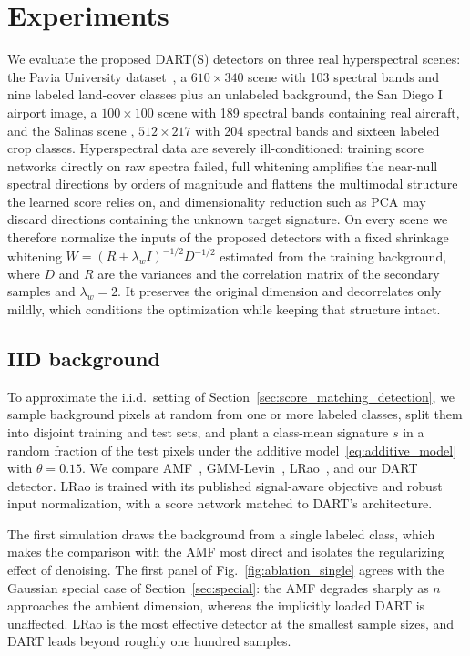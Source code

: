 \chapter{Experiments}
\label{sec:experiments}
We evaluate the proposed DART(S) detectors on three real hyperspectral
scenes: the Pavia University dataset~\cite{paviau_gic}, a $610\times340$
scene with 103 spectral bands and nine labeled land-cover classes plus an
unlabeled background, the San Diego I airport image, a $100\times100$ scene
with 189 spectral bands containing real aircraft, and the Salinas scene \cite{salinas_data},
$512\times217$ with 204 spectral bands and sixteen labeled crop classes.
Hyperspectral data are severely ill-conditioned: training score networks
directly on raw spectra failed, full whitening amplifies the near-null
spectral directions by orders of magnitude and flattens the multimodal
structure the learned score relies on, and dimensionality reduction such as
PCA may discard directions containing the unknown target signature. On
every scene we therefore normalize the inputs of the proposed detectors
with a fixed shrinkage whitening $W=(R+\lambda_w I)^{-1/2}D^{-1/2}$
estimated from the training background, where $D$ and $R$ are the variances
and the correlation matrix of the secondary samples and $\lambda_w=2$. It
preserves the original dimension and decorrelates only mildly, which
conditions the optimization while keeping that structure intact.


\section{IID background}
\label{sec:exp-iid}

To approximate the i.i.d.\ setting of Section~\ref{sec:score_matching_detection}, we sample background pixels at random from one or more labeled classes, split them into disjoint training and test sets, and plant a class-mean signature $s$ in a random fraction of the test pixels under the additive model~\eqref{eq:additive_model} with $\theta=0.15$.
We compare AMF~\cite{robey1992cfar,kelly1986adaptive}, GMM-Levin~\cite{levin2019cluster}, LRao~\cite{lrao2026}, and our DART detector. LRao is trained with its published signal-aware objective and robust input normalization, with a score network matched to DART's architecture.



The first simulation draws the background from a single labeled class, which makes the comparison with the AMF most direct and isolates the regularizing effect of denoising. The first panel of Fig.~\ref{fig:ablation_single} agrees with the Gaussian special case of Section~\ref{sec:special}: the AMF degrades sharply as $n$ approaches the ambient dimension, whereas the implicitly loaded DART is unaffected. LRao is the most effective detector at the smallest sample sizes, and DART leads beyond roughly one hundred samples.


